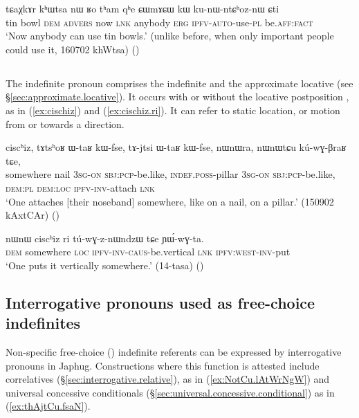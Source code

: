  \begin{exe}
\ex \label{ex:CWmACW.kW}
\gll tɕaχkɤr kʰɯtsa nɯ ʁo tʰam qʰe ɕɯmɤɕɯ kɯ ku-nɯ-ntɕʰoz-nɯ ɕti \\
tin bowl \textsc{dem} \textsc{advers} now \textsc{lnk} anybody \textsc{erg} \textsc{ipfv}-\textsc{auto}-use-\textsc{pl} be.\textsc{aff}:\textsc{fact} \\
\glt `Now anybody can use tin bowls.' (unlike before, when only important people could use it, 160702 khWtsa)
()
 \end{exe}
 
  \subsection{} \label{sec:cischiz}
The indefinite pronoun  comprises the indefinite  and the approximate locative  (see §\ref{sec:approximate.locative}). It occurs with or without the locative postposition , as in (\ref{ex:cischiz}) and (\ref{ex:cischiz.ri}). It can refer to static location, or motion from or towards a direction.

 \begin{exe}
\ex \label{ex:cischiz}
\gll ciscʰiz, tɤtsʰoʁ ɯ-taʁ kɯ-fse, tɤ-jtsi ɯ-taʁ kɯ-fse, nɯnɯra, nɯnɯtɕu kú-wɣ-βraʁ tɕe, \\
somewhere nail \textsc{3sg}-\textsc{on} \textsc{sbj}:\textsc{pcp}-be.like, \textsc{indef}.\textsc{poss}-pillar \textsc{3sg}-\textsc{on} \textsc{sbj}:\textsc{pcp}-be.like,  \textsc{dem}:\textsc{pl} \textsc{dem}:\textsc{loc} \textsc{ipfv}-\textsc{inv}-attach \textsc{lnk} \\
\glt `One attaches [their noseband] somewhere, like on a nail, on a pillar.' (150902 kAxtCAr) ()
 \end{exe}
 
 \begin{exe}
\ex \label{ex:cischiz.ri}
\gll nɯnɯ ciscʰiz ri tú-wɣ-z-nɯndzɯ tɕe ɲɯ́-wɣ-ta.\\
\textsc{dem} somewhere  \textsc{loc} \textsc{ipfv}-\textsc{inv}-\textsc{caus}-be.vertical \textsc{lnk} \textsc{ipfv}:\textsc{west}-\textsc{inv}-put\\
\glt `One puts it vertically somewhere.' (14-tasa) ()
 \end{exe}
  
 
\subsection{Interrogative pronouns used as free-choice indefinites} \label{sec:interrogative.indef}
Non-specific free-choice (\citealt[48]{haspelmath97indef}) indefinite referents can be expressed by interrogative pronouns in Japhug. Constructions where this function is attested include correlatives (§\ref{sec:interrogative.relative}), as in (\ref{ex:NotCu.lAtWrNgW}) and universal concessive conditionals (§\ref{sec:universal.concessive.conditional}) as in (\ref{ex:thAjtCu.fsaN}).
 
